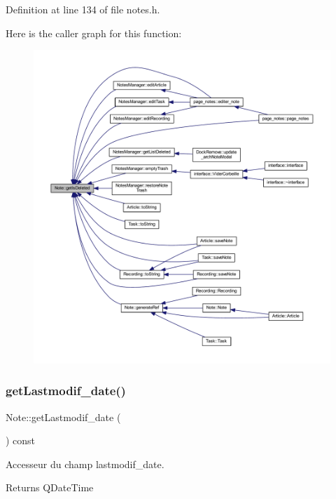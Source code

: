 Definition at line 134 of file notes.\+h.

Here is the caller graph for this function\+:\nopagebreak
\begin{figure}[H]
\begin{center}
\leavevmode
\includegraphics[width=350pt]{class_note_af56c546c7e0e471b2dd5b201d4835e37_icgraph}
\end{center}
\end{figure}
\mbox{\label{class_note_ab1811bb7017d2e1487c90f39b946d572}} 
\subsubsection{\texorpdfstring{get\+Lastmodif\+\_\+date()}{getLastmodif\_date()}}
{\footnotesize\ttfamily Note\+::get\+Lastmodif\+\_\+date (\begin{DoxyParamCaption}{ }\end{DoxyParamCaption}) const\hspace{0.3cm}{\ttfamily [inline]}}



Accesseur du champ lastmodif\+\_\+date. 

\begin{DoxyReturn}{Returns}
Q\+Date\+Time 
\end{DoxyReturn}


